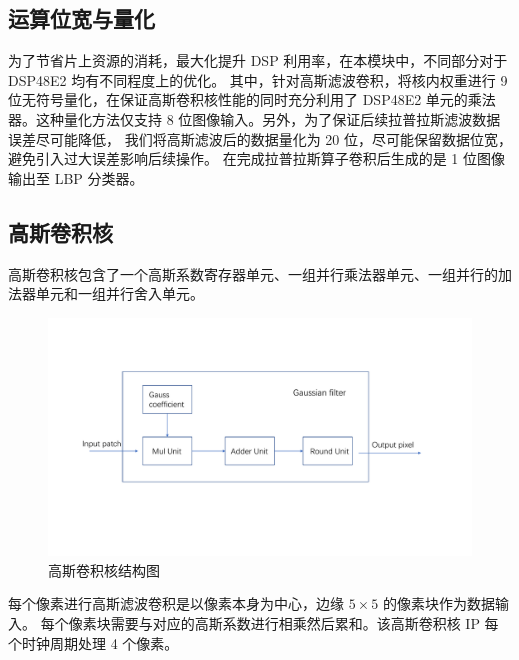 \documentclass[12pt, a4paper, oneside]{ctexbook}
\begin{document}
	
	
	\subsection{运算位宽与量化}
	为了节省片上资源的消耗，最大化提升 DSP 利用率，在本模块中，不同部分对于 DSP48E2 均有不同程度上的优化。
	其中，针对高斯滤波卷积，将核内权重进行 9 位无符号量化，在保证高斯卷积核性能的同时充分利用了 DSP48E2 
	单元的乘法器。这种量化方法仅支持 8 位图像输入。另外，为了保证后续拉普拉斯滤波数据误差尽可能降低，
	我们将高斯滤波后的数据量化为 20 位，尽可能保留数据位宽，避免引入过大误差影响后续操作。
	在完成拉普拉斯算子卷积后生成的是 1 位图像输出至 LBP 分类器。
	\subsection{高斯卷积核}
	高斯卷积核包含了一个高斯系数寄存器单元、一组并行乘法器单元、一组并行的加法器单元和一组并行舍入单元。
	\begin{figure}[h]
		\centering
		\includegraphics[scale=0.55]{pic/gaussian_filter}
		\caption{高斯卷积核结构图}
		\label{fig:gaussianfilter}
	\end{figure}
	每个像素进行高斯滤波卷积是以像素本身为中心，边缘 $5\times5$ 的像素块作为数据输入。
	每个像素块需要与对应的高斯系数进行相乘然后累和。该高斯卷积核 IP 每个时钟周期处理 4 个像素。
\end{document}
